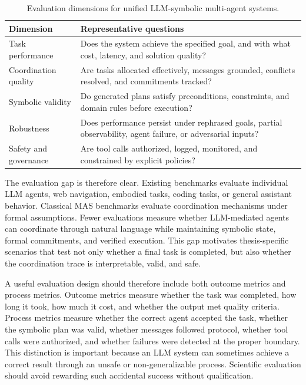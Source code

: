 \begin{table}[htbp]
\centering
\caption{Evaluation dimensions for unified LLM-symbolic multi-agent systems.}
\label{tab:evaluation}
\begin{tabular}{p{}p{}}
\toprule
\textbf{Dimension} & \textbf{Representative questions} \\
\midrule
Task performance & Does the system achieve the specified goal, and with what cost, latency, and solution quality? \\
Coordination quality & Are tasks allocated effectively, messages grounded, conflicts resolved, and commitments tracked? \\
Symbolic validity & Do generated plans satisfy preconditions, constraints, and domain rules before execution? \\
Robustness & Does performance persist under rephrased goals, partial observability, agent failure, or adversarial inputs? \\
Safety and governance & Are tool calls authorized, logged, monitored, and constrained by explicit policies? \\
\bottomrule
\end{tabular}
\end{table}

The evaluation gap is therefore clear. Existing benchmarks evaluate individual LLM agents, web navigation, embodied tasks, coding tasks, or general assistant behavior. Classical MAS benchmarks evaluate coordination mechanisms under formal assumptions. Fewer evaluations measure whether LLM-mediated agents can coordinate through natural language while maintaining symbolic state, formal commitments, and verified execution. This gap motivates thesis-specific scenarios that test not only whether a final task is completed, but also whether the coordination trace is interpretable, valid, and safe.

A useful evaluation design should therefore include both outcome metrics and process metrics. Outcome metrics measure whether the task was completed, how long it took, how much it cost, and whether the output met quality criteria. Process metrics measure whether the correct agent accepted the task, whether the symbolic plan was valid, whether messages followed protocol, whether tool calls were authorized, and whether failures were detected at the proper boundary. This distinction is important because an LLM system can sometimes achieve a correct result through an unsafe or non-generalizable process. Scientific evaluation should avoid rewarding such accidental success without qualification.

